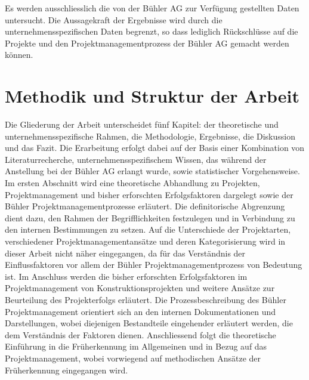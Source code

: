 \newline\newline
Es werden ausschliesslich die von der Bühler AG zur Verfügung gestellten Daten untersucht. Die Aussagekraft der Ergebnisse wird durch die unternehmensspezifischen Daten begrenzt, so dass lediglich Rückschlüsse auf die Projekte und den Projektmanagementprozess der Bühler AG gemacht werden können.
\section{Methodik und Struktur der Arbeit}
Die Gliederung der Arbeit unterscheidet fünf Kapitel: der theoretische und unternehmensspezifische Rahmen, die Methodologie, Ergebnisse, die Diskussion und das Fazit. Die Erarbeitung erfolgt dabei auf der Basis einer Kombination von Literaturrecherche, unternehmensspezifischem Wissen, das während der Anstellung bei der Bühler AG erlangt wurde, sowie statistischer Vorgehensweise.
\newline\newline
Im ersten Abschnitt wird eine theoretische Abhandlung zu Projekten, Projektmanagement und bisher erforschten Erfolgsfaktoren dargelegt sowie der Bühler Projektmanagementprozesse erläutert. Die definitorische Abgrenzung dient dazu, den Rahmen der Begrifflichkeiten festzulegen und in Verbindung zu den internen Bestimmungen zu setzen. Auf die Unterschiede der Projektarten, verschiedener Projektmanagementansätze und deren Kategorisierung wird in dieser Arbeit nicht näher eingegangen, da für das Verständnis der Einflussfaktoren vor allem der Bühler Projektmanagementprozess von Bedeutung ist. Im Anschluss werden die bisher erforschten Erfolgsfaktoren im Projektmanagement von Konstruktionsprojekten und weitere Ansätze zur Beurteilung des Projekterfolgs erläutert. Die Prozessbeschreibung des Bühler Projektmanagement orientiert sich an den internen Dokumentationen und Darstellungen, wobei diejenigen Bestandteile eingehender erläutert werden, die dem Verständnis der Faktoren dienen. Anschliessend folgt die theoretische Einführung in die Früherkennung im Allgemeinen und in Bezug auf das Projektmanagement, wobei vorwiegend auf methodischen Ansätze der Früherkennung eingegangen wird.
